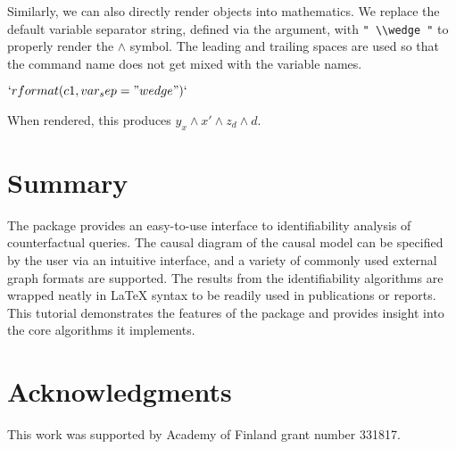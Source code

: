 Similarly, we can also directly render  objects into mathematics. We replace the default variable separator string, defined via the  argument, with \texttt{" \textbackslash{}\textbackslash{}wedge "} to properly render the \(\wedge\) symbol. The leading and trailing spaces are used so that the command name does not get mixed with the variable names.
\begin{example}
\(`r format(c1, var_sep = " \\wedge ")`\)
\end{example}
When rendered, this produces \(y_x \wedge x' \wedge z_d \wedge d\).

\section{Summary} \label{sec:summary}

The  package provides an easy-to-use interface to identifiability analysis of counterfactual queries. The causal diagram of the causal model can be specified by the user via an intuitive interface, and a variety of commonly used external graph formats are supported. The results from the identifiability algorithms are wrapped neatly in LaTeX syntax to be readily used in publications or reports. This tutorial demonstrates the features of the package and provides insight into the core algorithms it implements.

\section*{Acknowledgments}
This work was supported by Academy of Finland grant number 331817.

